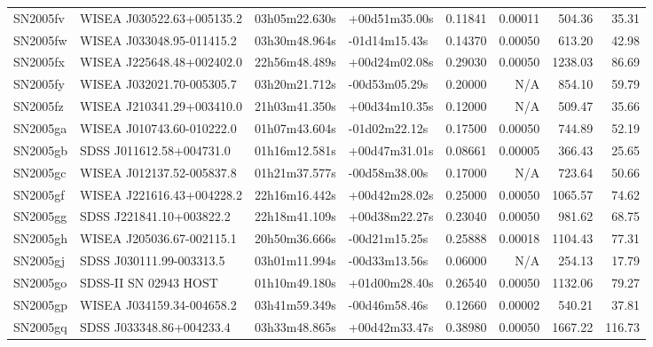 \begin{longtable}{llllrrrr}
SN2005fv         &       WISEA J030522.63+005135.2 &   03h05m22.630s &   +00d51m35.00s &  0.11841 &  0.00011 &   504.36 &       35.31 \\
SN2005fw         &       WISEA J033048.95-011415.2 &   03h30m48.964s &   -01d14m15.43s &  0.14370 &  0.00050 &   613.20 &       42.98 \\
SN2005fx         &       WISEA J225648.48+002402.0 &   22h56m48.489s &   +00d24m02.08s &  0.29030 &  0.00050 &  1238.03 &       86.69 \\
SN2005fy         &       WISEA J032021.70-005305.7 &   03h20m21.712s &   -00d53m05.29s &  0.20000 &      N/A &   854.10 &       59.79 \\
SN2005fz         &       WISEA J210341.29+003410.0 &   21h03m41.350s &   +00d34m10.35s &  0.12000 &      N/A &   509.47 &       35.66 \\
SN2005ga         &       WISEA J010743.60-010222.0 &   01h07m43.604s &   -01d02m22.12s &  0.17500 &  0.00050 &   744.89 &       52.19 \\
SN2005gb         &        SDSS J011612.58+004731.0 &   01h16m12.581s &   +00d47m31.01s &  0.08661 &  0.00005 &   366.43 &       25.65 \\
SN2005gc         &       WISEA J012137.52-005837.8 &   01h21m37.577s &   -00d58m38.00s &  0.17000 &      N/A &   723.64 &       50.66 \\
SN2005gf         &       WISEA J221616.43+004228.2 &   22h16m16.442s &   +00d42m28.02s &  0.25000 &  0.00050 &  1065.57 &       74.62 \\
SN2005gg         &        SDSS J221841.10+003822.2 &   22h18m41.109s &   +00d38m22.27s &  0.23040 &  0.00050 &   981.62 &       68.75 \\
SN2005gh         &       WISEA J205036.67-002115.1 &   20h50m36.666s &   -00d21m15.25s &  0.25888 &  0.00018 &  1104.43 &       77.31 \\
SN2005gj         &        SDSS J030111.99-003313.5 &   03h01m11.994s &   -00d33m13.56s &  0.06000 &      N/A &   254.13 &       17.79 \\
SN2005go         &           SDSS-II SN 02943 HOST &   01h10m49.180s &   +01d00m28.40s &  0.26540 &  0.00050 &  1132.06 &       79.27 \\
SN2005gp         &       WISEA J034159.34-004658.2 &   03h41m59.349s &   -00d46m58.46s &  0.12660 &  0.00002 &   540.21 &       37.81 \\
SN2005gq         &        SDSS J033348.86+004233.4 &   03h33m48.865s &   +00d42m33.47s &  0.38980 &  0.00050 &  1667.22 &      116.73 \\

\end{longtable}
